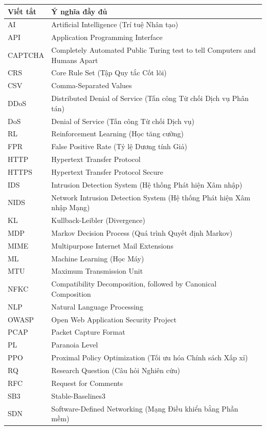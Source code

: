 \documentclass[12pt,a4paper,twoside]{report}
\begin{document}
\begin{longtable}[c]{p{3cm}p{12cm}}
\toprule
\textbf{Viết tắt} & \textbf{Ý nghĩa đầy đủ} \\
\midrule
AI & Artificial Intelligence (Trí tuệ Nhân tạo) \\
API & Application Programming Interface \\
CAPTCHA & Completely Automated Public Turing test to tell Computers and Humans Apart \\
CRS & Core Rule Set (Tập Quy tắc Cốt lõi) \\
CSV & Comma-Separated Values \\
DDoS & Distributed Denial of Service (Tấn công Từ chối Dịch vụ Phân tán) \\
DoS & Denial of Service (Tấn công Từ chối Dịch vụ) \\
RL & Reinforcement Learning (Học tăng cường) \\
FPR & False Positive Rate (Tỷ lệ Dương tính Giả) \\
HTTP & Hypertext Transfer Protocol \\
HTTPS & Hypertext Transfer Protocol Secure \\
IDS & Intrusion Detection System (Hệ thống Phát hiện Xâm nhập) \\
NIDS & Network Intrusion Detection System (Hệ thống Phát hiện Xâm nhập Mạng) \\
KL & Kullback-Leibler (Divergence) \\
MDP & Markov Decision Process (Quá trình Quyết định Markov) \\
MIME & Multipurpose Internet Mail Extensions \\
ML & Machine Learning (Học Máy) \\
MTU & Maximum Transmission Unit \\
NFKC & Compatibility Decomposition, followed by Canonical Composition \\
NLP & Natural Language Processing \\
OWASP & Open Web Application Security Project \\
PCAP & Packet Capture Format \\
PL & Paranoia Level \\
PPO & Proximal Policy Optimization (Tối ưu hóa Chính sách Xấp xỉ) \\
RQ & Research Question (Câu hỏi Nghiên cứu) \\
RFC & Request for Comments \\
SB3 & Stable-Baselines3 \\
SDN & Software-Defined Networking (Mạng Điều khiển bằng Phần mềm) \\

\end{longtable}
\end{document}
